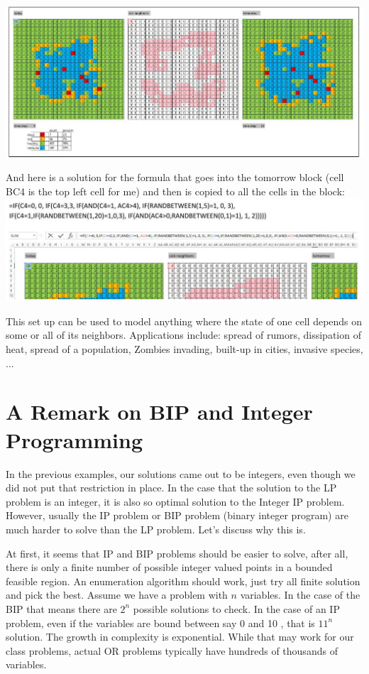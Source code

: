 \documentclass[10pt]{article}
\begin{document}
\includegraphics[max width=\textwidth]{2022_07_05_5945264bba2a5f6ba667g-25}

And here is a solution for the formula that goes into the tomorrow block (cell BC4 is the top left cell for me) and then is copied to all the cells in the block:\\

\includegraphics[max width=\textwidth]{2022_07_05_5945264bba2a5f6ba667g-25(1)}

This set up can be used to model anything where the state of one cell depends on some or all of its neighbors. Applications include: spread of rumors, dissipation of heat, spread of a population, Zombies invading, built-up in cities, invasive species, ...



\section{A Remark on BIP and Integer Programming}
In the previous examples, our solutions came out to be integers, even though we did not put that restriction in place. In the case that the solution to the LP problem is an integer, it is also so optimal solution to the Integer IP problem. However, usually the IP problem or BIP problem (binary integer program) are much harder to solve than the LP problem. Let's discuss why this is.

At first, it seems that IP and BIP problems should be easier to solve, after all, there is only a finite number of possible integer valued points in a bounded feasible region. An enumeration algorithm should work, just try all finite solution and pick the best. Assume we have a problem with $n$ variables. In the case of the BIP that means there are $2^{n}$ possible solutions to check. In the case of an IP problem, even if the variables are bound between say 0 and 10 , that is $11^{n}$ solution. The growth in complexity is exponential. While that may work for our class problems, actual OR problems typically have hundreds of thousands of variables.
\end{document}
